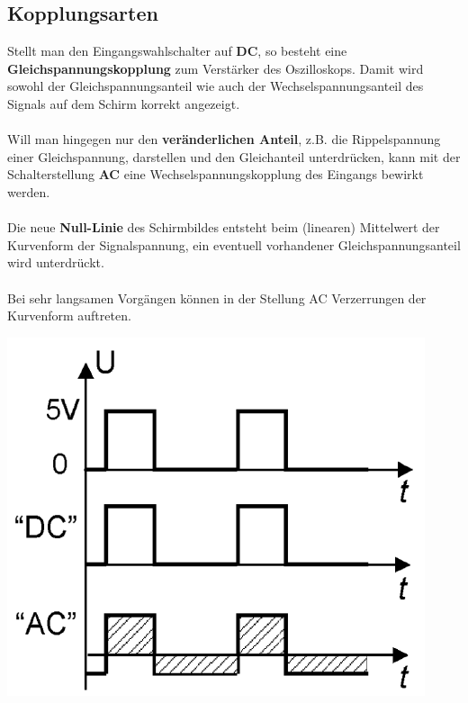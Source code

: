 \subsection{Kopplungsarten}
Stellt man den Eingangswahlschalter auf \textbf{DC}, so besteht eine \textbf{Gleichspannungskopplung} zum Verstärker des Oszilloskops. Damit wird sowohl der Gleichspannungsanteil wie auch der Wechselspannungsanteil des Signals auf dem Schirm korrekt angezeigt. 
\\\\
Will man hingegen nur den \textbf{veränderlichen Anteil}, z.B. die Rippelspannung einer Gleichspannung, darstellen und den Gleichanteil unterdrücken, kann mit der Schalterstellung \textbf{AC} eine Wechselspannungskopplung des Eingangs bewirkt werden.
\\\\
Die neue \textbf{Null-Linie} des Schirmbildes entsteht beim (linearen) Mittelwert der Kurvenform der Signalspannung, ein eventuell vorhandener Gleichspannungsanteil wird unterdrückt. 
\\\\
Bei sehr langsamen Vorgängen können in der Stellung AC Verzerrungen der Kurvenform auftreten.
\begin{center}
\includegraphics[scale=0.75]{../img/IV/IVa}
\end{center}
